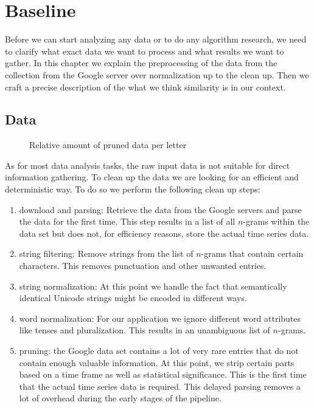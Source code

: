 \chapter{Baseline}
\label{ch:baseline}

Before we can start analyzing any data or to do any algorithm research, we need to clarify what exact data we want to process and what results we want to gather. In this chapter we explain the preprocessing of the data from the collection from the Google server over normalization up to the clean up. Then we craft a precise description of the what we think similarity is in our context.



\section{Data}
\label{sec:baseline:data}

\begin{figure}
    \centering
    
    \caption{Relative amount of pruned data per letter}\label{fig:clean_up_sums}
\end{figure}

As for most data analysis tasks, the raw input data is not suitable for direct information gathering. To clean up the data we are looking for an efficient and deterministic way. To do so we perform the following clean up steps:

\begin{enumerate}
    \item download and parsing: Retrieve the data from the Google servers and parse the data for the first time. This step results in a list of all $n$-grams within the data set but does not, for efficiency reasons, store the actual time series data.
    \item string filtering: Remove strings from the list of $n$-grams that contain certain characters. This removes punctuation and other unwanted entries.
    \item string normalization: At this point we handle the fact that semantically identical Unicode strings might be encoded in different ways.
    \item word normalization: For our application we ignore different word attributes like tenses and pluralization. This results in an unambiguous list of $n$-grams.
    \item pruning: the Google data set contains a lot of very rare entries that do not contain enough valuable information. At this point, we strip certain parts based on a time frame as well as statistical significance. This is the first time that the actual time series data is required. This delayed parsing removes a lot of overhead during the early stages of the pipeline.
\end{enumerate}

